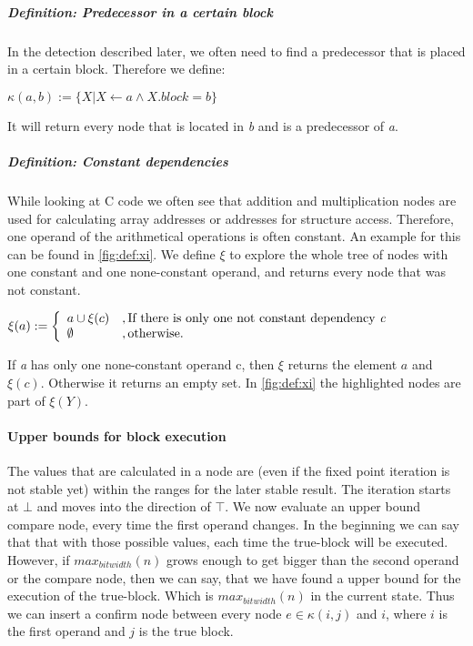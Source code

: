 \subparagraph{Definition: Predecessor in a certain block}
In the detection described later, we often need to find a predecessor that is placed in a certain block. Therefore we define:
\begin{center}
$\kappa(a, b) := \{X| X \leftarrow a \wedge X.block = b \}$ 
\end{center}

It will return every node that is located in \textit{b} and is a predecessor of \textit{a}.

\subparagraph{Definition: Constant dependencies}

While looking at C code we often see that addition and multiplication nodes are used for calculating array addresses or addresses for structure access. Therefore, one operand of the arithmetical operations is often constant. An example for this can be found in \autoref{fig:def:xi}.
We define $\xi$ to explore the whole tree of nodes with one constant and one none-constant operand, and returns every node that was not constant.
\begin{center}
$\xi(a) := 
\left\{
	\begin{array}{l}
		a \cup \xi(c)\\ 
		\emptyset
	\end{array}
	\begin{array}{l}
		, \text{If there is only one not constant dependency \textit{c}} \\ 
		, \text{otherwise}.
	\end{array}
\right.$
\end{center}

If \textit{a} has only one none-constant operand c, then $\xi$ returns the element $a$ and $\xi(c)$. Otherwise it returns an empty set. In \autoref{fig:def:xi} the highlighted nodes are part of $\xi(Y)$.

\paragraph{Upper bounds for block execution}
The values that are calculated in a node are (even if the fixed point iteration is not stable yet) within the ranges for the later stable result. The iteration starts at $\bot$ and moves into the direction of $\top$. 
We now evaluate an upper bound compare node, every time the first operand changes. In the beginning we can say that that with those possible values, each time the true-block will be executed. However, if $max_{bitwidth}(n)$ grows enough to get bigger than the second operand or the compare node, then we can say, that we have found a upper bound for the execution of the true-block. Which is $max _{bitwidth}(n)$ in the current state. Thus we can insert a confirm node between every node $e \in \kappa(i, j)$ and $i$, where $i$ is the first operand and $j$ is the true block.
\label{upper_bound_insert_confirm}

